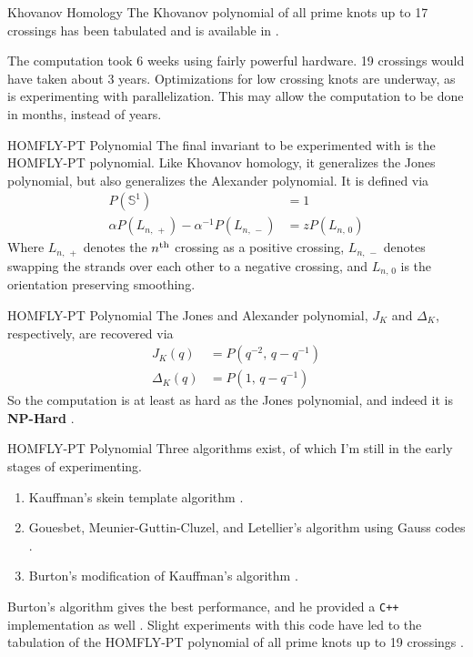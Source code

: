 \documentclass{beamer}
\begin{document}
    \begin{frame}{Khovanov Homology}
        The Khovanov polynomial of all prime knots up to 17 crossings has been
        tabulated and is available in \cite{KhovanovData}.
        \par\hfill\par
        The computation took 6 weeks using fairly powerful hardware.
        19 crossings would have taken about 3 years. Optimizations for low
        crossing knots are underway, as is experimenting with parallelization.
        This may allow the computation to be done in months, instead of years.
    \end{frame}
    \begin{frame}{HOMFLY-PT Polynomial}
        The final invariant to be experimented with is the HOMFLY-PT
        polynomial. Like Khovanov homology, it generalizes the Jones polynomial,
        but also generalizes the Alexander polynomial. It is defined via
        \begin{align}
            P(\mathbb{S}^{1})&=1\\
            \alpha{P}(L_{n,\,+})-\alpha^{-1}P(L_{n,\,-})
            &=zP(L_{n,\,0})
        \end{align}
        Where $L_{n,\,+}$ denotes the $n^{\small\textrm{th}}$ crossing as a
        positive crossing, $L_{n,\,-}$ denotes swapping the strands over each
        other to a negative crossing, and $L_{n,\,0}$ is the
        orientation preserving smoothing.
    \end{frame}
    \begin{frame}{HOMFLY-PT Polynomial}
        The Jones and Alexander polynomial, $J_{K}$ and $\Delta_{K}$,
        respectively, are recovered via
        \begin{align}
            J_{K}(q)&=P(q^{-2},\,q-q^{-1})\\
            \Delta_{K}(q)&=P(1,\,q-q^{-1})
        \end{align}
        So the computation is at least as hard as the Jones polynomial, and
        indeed it is \textbf{NP-Hard} \cite{HOMFLYPTNPHard}.
    \end{frame}
    \begin{frame}{HOMFLY-PT Polynomial}
        Three algorithms exist, of which I'm still in the early stages of
        experimenting.
        \begin{enumerate}
            \item Kauffman's skein template algorithm \cite{KauffmanStateModelsLinkPolynomials}.
            \item Gouesbet, Meunier-Guttin-Cluzel, and Letellier's algorithm using Gauss codes \cite{GouesbetHOMFLYAlgorithm}.
            \item Burton's modification of Kauffman's algorithm \cite{Burton2018HOMFLFixedParameter}.
        \end{enumerate}
        Burton's algorithm gives the best performance, and he provided a
        \texttt{C++} implementation as well \cite{regina}. Slight experiments
        with this code have led to the tabulation of the HOMFLY-PT polynomial
        of all prime knots up to 19 crossings
        \cite{HOMFLYData}.
    \end{frame}
\end{document}
